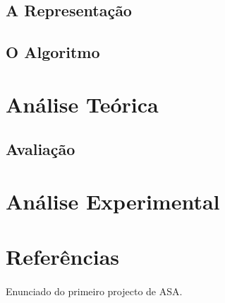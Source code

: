 \documentclass[12pt, a4paper]{article}
\begin{document}
\subsection{A Representação}
\paragraph{}

\subsection{O Algoritmo}
\paragraph{}

\section{Análise Teórica}
\subsection{Avaliação}
\paragraph{}

\section{Análise Experimental}
\paragraph{}

\section{Referências}
\paragraph{}
\indent[1] Enunciado do primeiro projecto de ASA.
\end{document}
